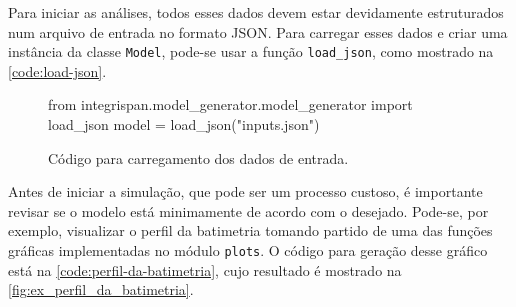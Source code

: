 
Para iniciar as análises, todos esses dados devem estar devidamente estruturados num arquivo de entrada no formato JSON.
Para carregar esses dados e criar uma instância da classe \texttt{Model}, pode-se usar a função \texttt{load\_json}, como mostrado na \autoref{code:load-json}.


\begin{figure}
	\caption{Código para carregamento dos dados de entrada.}\label{code:load-json}
	\begin{pythoncode}
from integrispan.model_generator.model_generator import load_json
model = load_json("inputs.json")
	\end{pythoncode}
\end{figure}

Antes de iniciar a simulação, que pode ser um processo custoso, é importante revisar se o modelo está minimamente de acordo com o desejado. Pode-se, por exemplo, visualizar o perfil da batimetria tomando partido de uma das funções gráficas implementadas no módulo \texttt{plots}. O código para geração desse gráfico está na \autoref{code:perfil-da-batimetria}, cujo resultado é mostrado na \autoref{fig:ex_perfil_da_batimetria}.

